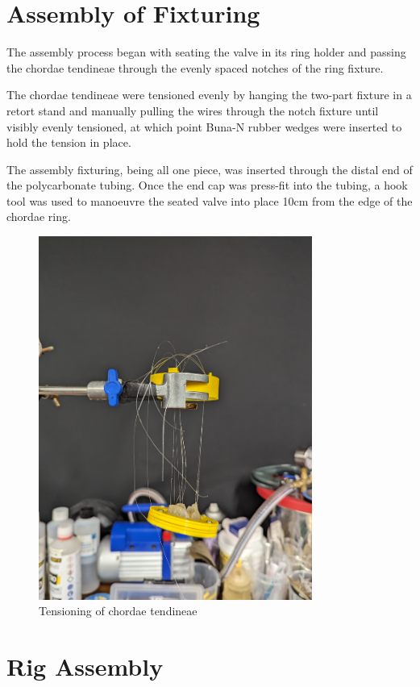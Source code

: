 \section{Assembly of Fixturing}
The assembly process began with seating the valve in its ring holder and passing the chordae tendineae through the evenly spaced notches of the ring fixture.

The chordae tendineae were tensioned evenly by hanging the two-part fixture in a retort stand and manually pulling the wires through the notch fixture until visibly evenly tensioned, at which point Buna-N rubber wedges were inserted to hold the tension in place.

The assembly fixturing, being all one piece, was inserted through the distal end of the polycarbonate tubing. Once the end cap was press-fit into the tubing, a hook tool was used to manoeuvre the seated valve into place 10cm from the edge of the chordae ring.
\begin{figure}[H]
    \centering
    \includegraphics[width=0.8\textwidth]{figures/assemblingfixtures.jpg}
    \caption{Tensioning of chordae tendineae}
    \label{fig:chordtens}
\end{figure}

\section{Rig Assembly}


